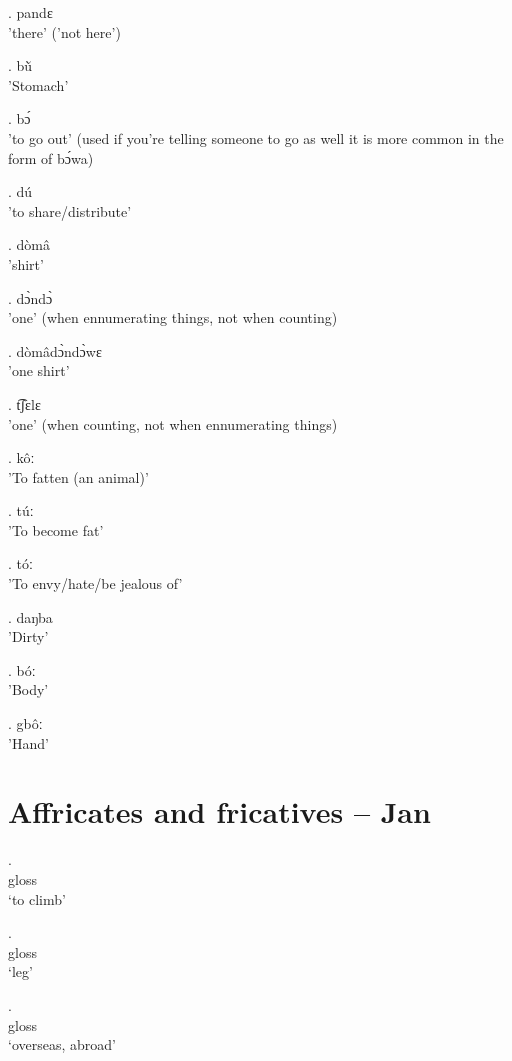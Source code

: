 \documentclass{assets/fieldnotes}
\begin{document}
\ex. pandɛ \\
'there' ('not here')

\ex. bù̆ \\
'Stomach'

\ex. bɔ́ \\
'to go out' (used if you're telling someone to go as well it is more common in the form of bɔ́wa)

\ex. dú \\
'to share/distribute'

\ex. dòmâ \\
'shirt'

\ex. dɔ̀ndɔ̀ \\
'one' (when ennumerating things, not when counting)

\ex. dòmâdɔ̀ndɔ̀wɛ \\
'one shirt'

\ex. t͡ʃɛlɛ \\
'one' (when counting, not when ennumerating things)




\ex. kôː \\
'To fatten (an animal)'

\ex. túː \\
'To become fat' \\

\ex. tóː \\
'To envy/hate/be jealous of'

\ex. daŋba\\
'Dirty'

\ex. bóː\\
'Body'

\ex. gbôː\\
'Hand'





\section{Affricates and fricatives -- Jan}

\exg.
 \\
gloss \\
`to climb' %

\exg.  \\
gloss \\
`leg' 

\exg.  \\ 
gloss \\
`overseas, abroad' 
\end{document}
